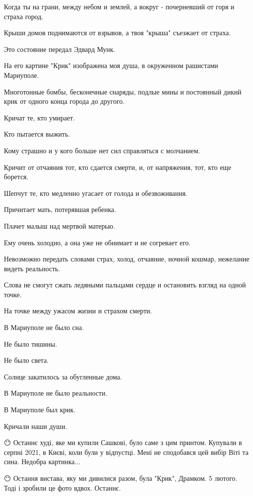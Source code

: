 Когда ты на грани, между небом и землей, а вокруг - почерневший от горя и
страха город.

Крыши домов поднимаются от взрывов, а твоя "крыша"  съезжает от страха.

Это состояние передал Эдвард Мунк.

На его картине "Крик" изображена моя душа, в окруженном рашистами  Мариуполе. 

Многотонные бомбы, бесконечные снаряды, подлые мины и постоянный дикий крик от
одного конца города до другого. 

Кричат те, кто умирает. 

Кто пытается выжить. 

Кому страшно и у кого больше нет сил справляться с молчанием.

Кричит от отчаяния тот, кто сдается смерти, и, от напряжения, тот, кто еще
борется.

Шепчут те, кто медленно угасает от голода и обезвоживания.

Причитает мать, потерявшая ребенка. 

Плачет малыш над мертвой матерью. 

Ему очень холодно, а она уже не обнимает и не согревает его.

Невозможно передать словами страх, холод, отчаяние, ночной кошмар, нежелание
видеть реальность. 

Слова не смогут сжать ледяными пальцами сердце и остановить взгляд  на одной
точке.

На точке между ужасом жизни и страхом смерти.

В Мариуполе не было сна. 

Не было тишины. 

Не было света. 

Солнце закатилось за обугленные дома. 

В Мариуполе не было реальности. 

В Мариуполе был крик.

Кричали наши души.
🖤

😶 Останнє худі, яке ми купили Сашкові, було саме з цим принтом. Купували в
серпні 2021, в Києві, коли були у відпустці. Мені не сподобався цей вибір Віті
та сина. Недобра картинка... 

😶 Остання вистава, яку ми дивилися разом, була "Крик", Драмком. 5 лютого. Тоді
і зробили це фото вдвох. Останнє. 

🥀
